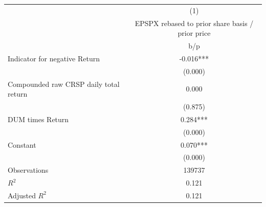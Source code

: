 {
\def\sym#1{\ifmmode^{#1}\else\(^{#1}\)\fi}
\begin{tabular}{l*{1}{c}}
\hline\hline
                    &\multicolumn{1}{c}{(1)}\\
                    &\multicolumn{1}{c}{EPSPX rebased to prior share basis / prior price}\\
                    &         b/p   \\
\hline
Indicator for negative Return&      -0.016***\\
                    &     (0.000)   \\
Compounded raw CRSP daily total return&       0.000   \\
                    &     (0.875)   \\
DUM times Return    &       0.284***\\
                    &     (0.000)   \\
Constant            &       0.070***\\
                    &     (0.000)   \\
\hline
Observations        &      139737   \\
\(R^{2}\)           &       0.121   \\
Adjusted \(R^{2}\)  &       0.121   \\
\hline\hline
\end{tabular}
}
